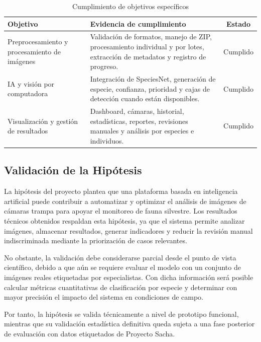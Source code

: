 \begin{table}[H]
\centering
\caption{Cumplimiento de objetivos específicos}
\label{tab:cumplimiento_objetivos}
\begin{tabularx}{\textwidth}{lXc}
\toprule
\textbf{Objetivo} & \textbf{Evidencia de cumplimiento} & \textbf{Estado} \\
\midrule
Preprocesamiento y procesamiento de imágenes & Validación de formatos, manejo de ZIP, procesamiento individual y por lotes, extracción de metadatos y registro de progreso. & Cumplido \\
IA y visión por computadora & Integración de SpeciesNet, generación de especie, confianza, prioridad y cajas de detección cuando están disponibles. & Cumplido \\
Visualización y gestión de resultados & Dashboard, cámaras, historial, estadísticas, reportes, revisiones manuales y análisis por especies e individuos. & Cumplido \\
\bottomrule
\end{tabularx}
\end{table}

\subsection{Validación de la Hipótesis}
\label{subsec:validacion_hipotesis}

La hipótesis del proyecto plantea que una plataforma basada en inteligencia artificial puede contribuir a automatizar y optimizar el análisis de imágenes de cámaras trampa para apoyar el monitoreo de fauna silvestre. Los resultados técnicos obtenidos respaldan esta hipótesis, ya que el sistema permite analizar imágenes, almacenar resultados, generar indicadores y reducir la revisión manual indiscriminada mediante la priorización de casos relevantes.

No obstante, la validación debe considerarse parcial desde el punto de vista científico, debido a que aún se requiere evaluar el modelo con un conjunto de imágenes reales etiquetadas por especialistas. Con dicha información será posible calcular métricas cuantitativas de clasificación por especie y determinar con mayor precisión el impacto del sistema en condiciones de campo.

Por tanto, la hipótesis se valida técnicamente a nivel de prototipo funcional, mientras que su validación estadística definitiva queda sujeta a una fase posterior de evaluación con datos etiquetados de Proyecto Sacha.

